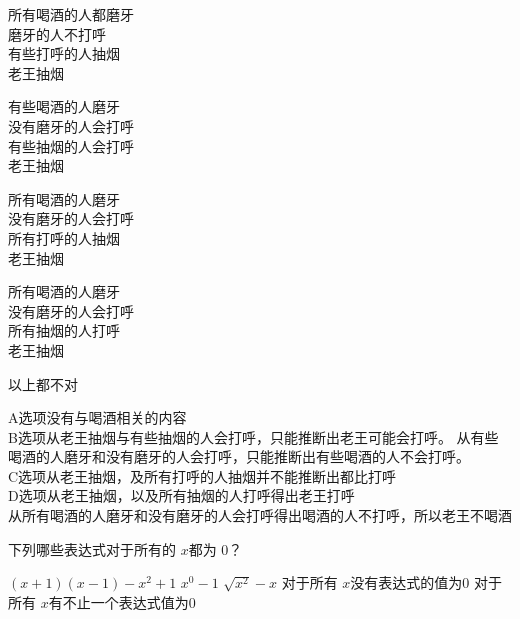 \begin{questions}
	\begin{oneparchoices}
		\choice
		\begin{minipage}{0.25\textwidth}
			所有喝酒的人都磨牙\\
			磨牙的人不打呼 \\
			有些打呼的人抽烟 \\
			老王抽烟
		\end{minipage}
		\choice
		\begin{minipage}{0.25\textwidth}
			有些喝酒的人磨牙 \\
			没有磨牙的人会打呼 \\
			有些抽烟的人会打呼 \\
			老王抽烟
		\end{minipage}
		\choice
		\begin{minipage}{0.25\textwidth}
			所有喝酒的人磨牙 \\
			没有磨牙的人会打呼 \\
			所有打呼的人抽烟 \\
			老王抽烟
		\end{minipage}
		\CorrectChoice
		\begin{minipage}{0.25\textwidth}
			所有喝酒的人磨牙 \\
			没有磨牙的人会打呼 \\
			所有抽烟的人打呼 \\
			老王抽烟
		\end{minipage}
		\choice
		\begin{minipage}{0.25\textwidth}
			以上都不对
		\end{minipage}
	\end{oneparchoices}

	\begin{solution}

		A选项没有与喝酒相关的内容 \\
		B选项从老王抽烟与有些抽烟的人会打呼，只能推断出老王可能会打呼。
		从有些喝酒的人磨牙和没有磨牙的人会打呼，只能推断出有些喝酒的人不会打呼。\\
		C选项从老王抽烟，及所有打呼的人抽烟并不能推断出都比打呼 \\
		D选项从老王抽烟，以及所有抽烟的人打呼得出老王打呼\\
		从所有喝酒的人磨牙和没有磨牙的人会打呼得出喝酒的人不打呼，所以老王不喝酒

	\end{solution}

	\question 下列哪些表达式对于所有的 \( x \)都为 0？
	\begin{oneparchoices}
		\choice \( (x+1)(x-1) - x^2 + 1 \) \choice \( x^0 - 1 \) \choice \( \sqrt{x^2} - x\) \choice 对于所有 \( x
		\)没有表达式的值为0 \CorrectChoice 对于所有 \( x \)有不止一个表达式值为0
	\end{oneparchoices}


\end{questions}
